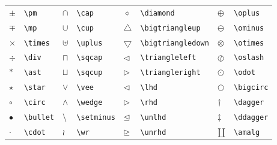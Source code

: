 \documentclass[fleqn]{icat-ufal}
\begin{document}
\begin{spacing}{1}
\begin{longtable}{p{4mm}p{20mm}p{4mm}p{25mm}p{4mm}p{34mm}p{4mm}p{20mm}} \hline
  $\pm             $ & \lstinline!\pm!              &
  $\cap            $ & \lstinline!\cap!             &
  $\diamond        $ & \lstinline!\diamond!         &
  $\oplus          $ & \lstinline!\oplus!           \\
  $\mp             $ & \lstinline!\mp!              &
  $\cup            $ & \lstinline!\cup!             &
  $\bigtriangleup  $ & \lstinline!\bigtriangleup!   &
  $\ominus         $ & \lstinline!\ominus!          \\
  $\times          $ & \lstinline!\times!           &
  $\uplus          $ & \lstinline!\uplus!           &
  $\bigtriangledown$ & \lstinline!\bigtriangledown! &
  $\otimes         $ & \lstinline!\otimes!          \\
  $\div            $ & \lstinline!\div!             &
  $\sqcap          $ & \lstinline!\sqcap!           &
  $\triangleleft   $ & \lstinline!\triangleleft!    &
  $\oslash         $ & \lstinline!\oslash!          \\
  $\ast            $ & \lstinline!\ast!             &
  $\sqcup          $ & \lstinline!\sqcup!           &
  $\triangleright  $ & \lstinline!\triangleright!   &
  $\odot           $ & \lstinline!\odot!            \\
  $\star           $ & \lstinline!\star!            &
  $\vee            $ & \lstinline!\vee!             &
  $\lhd            $ & \lstinline!\lhd!             &
  $\bigcirc        $ & \lstinline!\bigcirc!         \\
  $\circ           $ & \lstinline!\circ!            &
  $\wedge          $ & \lstinline!\wedge!           &
  $\rhd            $ & \lstinline!\rhd!             &
  $\dagger         $ & \lstinline!\dagger!          \\
  $\bullet         $ & \lstinline!\bullet!          &
  $\setminus       $ & \lstinline!\setminus!        &
  $\unlhd          $ & \lstinline!\unlhd!           &
  $\ddagger        $ & \lstinline!\ddagger!         \\
  $\cdot           $ & \lstinline!\cdot!            &
  $\wr             $ & \lstinline!\wr!              &
  $\unrhd          $ & \lstinline!\unrhd!           &
  $\amalg          $ & \lstinline!\amalg!           \\ \hline
\end{longtable}


\end{spacing}
\end{document}
